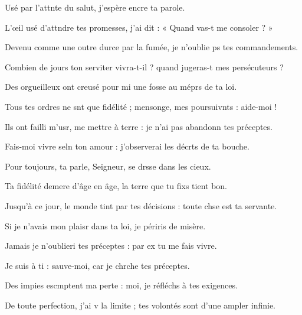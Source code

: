 \item Usé par l’attnte du salut,\psstar{} j’espère encre ta parole.
\item L’œil usé d’attndre tes promesses,\psstar{} j’ai dit : « Quand vas-t me consoler ? »
\item Devenu comme une outre durce par la fumée,\psstar{} je n’oublie ps tes commandements.
\item Combien de jours ton serviter vivra-t-il ?\psstar{} quand jugeras-t mes persécuteurs ?
\item Des orgueilleux ont creusé pour mi une fosse\psstar{} au méprs de ta loi.
\item Tous tes ordres ne snt que fidélité ;\psstar{} mensonge, mes poursuivnts : aide-moi !
\item Ils ont failli m’usr, me mettre à terre :\psstar{} je n’ai pas abandonn tes préceptes.
\item Fais-moi vivre seln ton amour :\psstar{} j’observerai les décrts de ta bouche.
\item Pour toujours, ta parle, Seigneur,\psstar{} se drsse dans les cieux.
\item Ta fidélité demere d’âge en âge,\psstar{} la terre que tu fixs tient bon.
\item Jusqu’à ce jour, le monde tint par tes décisions :\psstar{} toute chse est ta servante.
\item Si je n’avais mon plaisr dans ta loi,\psstar{} je périris de misère.
\item Jamais je n’oublieri tes préceptes :\psstar{} par ex tu me fais vivre.
\item Je suis à ti : sauve-moi,\psstar{} car je chrche tes préceptes.
\item Des impies escmptent ma perte :\psstar{} moi, je réfléchs à tes exigences.
\item De toute perfection, j’ai v la limite ;\psstar{} tes volontés sont d’une ampler infinie.